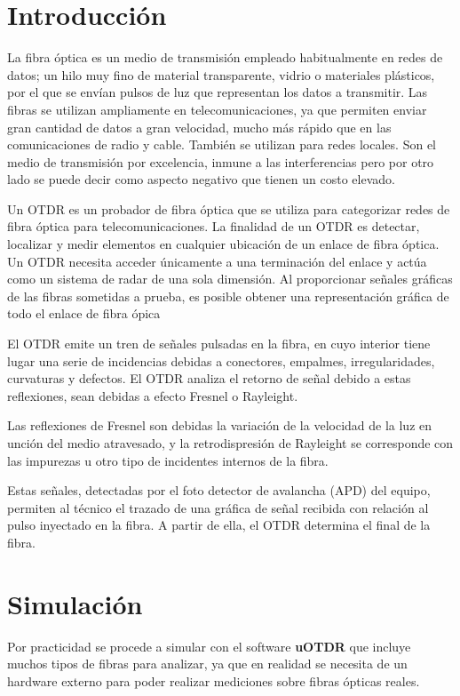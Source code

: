 \documentclass{article}
\begin{document}

\section{Introducción}
La fibra óptica es un medio de transmisión empleado habitualmente en redes de datos; un hilo muy fino de material transparente, vidrio o materiales plásticos, por el que se envían pulsos de luz que representan los datos a transmitir. Las fibras se utilizan ampliamente en telecomunicaciones, ya que permiten enviar gran cantidad de datos a gran velocidad, mucho más rápido que en las comunicaciones de radio y cable. También se utilizan para redes locales. Son el medio de transmisión por excelencia, inmune
a las interferencias pero por otro lado se puede decir como aspecto negativo que tienen un costo elevado.

Un OTDR es un probador de fibra óptica que se utiliza para categorizar redes de fibra óptica para telecomunicaciones. La finalidad de un OTDR es detectar, localizar y medir elementos en cualquier ubicación de un enlace de fibra óptica. Un OTDR necesita acceder únicamente a una terminación del enlace y actúa como un sistema de radar de una sola dimensión. Al proporcionar señales gráficas de las fibras sometidas a prueba, es posible obtener una representación gráfica de todo el enlace de fibra ópica

El OTDR emite un tren de señales pulsadas en la fibra, en cuyo interior tiene lugar una serie de incidencias debidas a conectores, empalmes, irregularidades, curvaturas y defectos. El OTDR analiza el retorno de señal debido a estas reflexiones, sean debidas a efecto Fresnel o Rayleight.

Las reflexiones de Fresnel son debidas la variación de la velocidad de la luz en unción del medio atravesado, y la retrodispresión de Rayleight se corresponde con las impurezas u otro tipo de incidentes internos de la fibra.

Estas señales, detectadas por el foto detector de avalancha (APD) del equipo, permiten al técnico el trazado de una gráfica de señal recibida con relación al pulso inyectado en la fibra. A partir de ella, el OTDR determina el final de la fibra.

\section{Simulación}
Por practicidad se procede a simular con el software \textbf{uOTDR} que incluye muchos tipos de fibras para analizar, ya que en realidad se necesita de un hardware externo para poder realizar mediciones sobre fibras ópticas reales.
\end{document}
